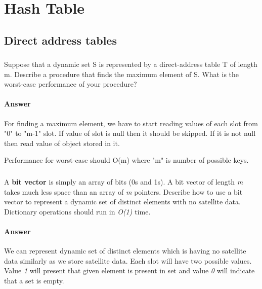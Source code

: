 \chapter{Hash Table}
  \section{Direct address tables}
    \subsection {}

    Suppose that a dynamic set S is represented by a direct-address table T of
    length m. Describe a procedure that finds the maximum element of S. What is
    the worst-case performance of your procedure?

      \subsubsection {Answer}

      For finding a maximum element, we have to start reading values of each slot
      from "0" to "m-1" slot. If value of slot is null then it should be skipped.
      If it is not null then read value of object stored in it.

      Performance for worst-case should O(m) where "m" is number of possible
      keys.

    \subsection {}

    A \textbf{bit vector} is simply an array of bits (0s and 1s). A bit vector
    of length \textit{m} takes much less space than an array of \textit{m}
    pointers. Describe how to use a bit vector to represent a dynamic set of
    distinct elements with no satellite data. Dictionary operations should run
    in \textit{O(1)} time.

      \subsubsection {Answer}

      We can represent dynamic set of distinct elements which is having no
      satellite data similarly as we store satellite data. Each slot will have
      two possible values. Value \textit{1} will present that given element is
      present in set and value \textit{0} will indicate that a set is empty.

